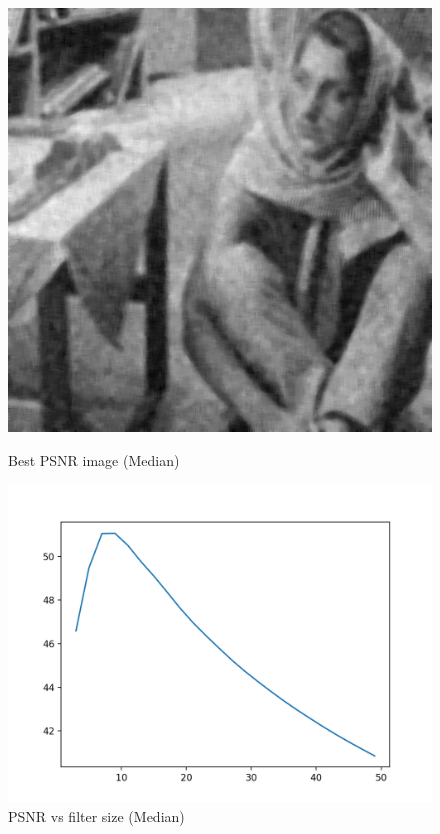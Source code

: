 \documentclass{article}
\begin{document}
    \begin{figure}[!htb]
      \includegraphics[scale=0.3]{./basic_denoising/barbara/median_best_gaussian.png}
      \caption{Best PSNR image (Median)}
    \endminipage \hfill
      \includegraphics[scale=.45]{./basic_denoising/barbara/median_psnr_gaussian.png}
      \caption{PSNR vs filter size (Median)}
    \endminipage
    \end{figure}
    \pagebreak
\end{document}
